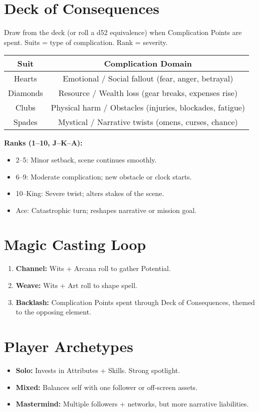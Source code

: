 \documentclass[12pt]{book}
\begin{document}
\section*{Deck of Consequences}
Draw from the deck (or roll a d52 equivalence) when Complication Points are spent.  
Suits = type of complication. Rank = severity.

\begin{tabular}{|c|c|}
\hline
\textbf{Suit} & \textbf{Complication Domain} \\
\hline
Hearts & Emotional / Social fallout (fear, anger, betrayal) \\
\hline
Diamonds & Resource / Wealth loss (gear breaks, expenses rise) \\
\hline
Clubs & Physical harm / Obstacles (injuries, blockades, fatigue) \\
\hline
Spades & Mystical / Narrative twists (omens, curses, chance) \\
\hline
\end{tabular}

\medskip
\noindent
\textbf{Ranks (1–10, J–K–A):}  
\begin{itemize}
  \item 2–5: Minor setback, scene continues smoothly.  
  \item 6–9: Moderate complication; new obstacle or clock starts.  
  \item 10–King: Severe twist; alters stakes of the scene.  
  \item Ace: Catastrophic turn; reshapes narrative or mission goal.  
\end{itemize}

\section*{Magic Casting Loop}
\begin{enumerate}
  \item \textbf{Channel:} Wits + Arcana roll to gather Potential.  
  \item \textbf{Weave:} Wits + Art roll to shape spell.  
  \item \textbf{Backlash:} Complication Points spent through Deck of Consequences, themed to the opposing element.  
\end{enumerate}

\section*{Player Archetypes}
\begin{itemize}
  \item \textbf{Solo:} Invests in Attributes + Skills. Strong spotlight.  
  \item \textbf{Mixed:} Balances self with one follower or off-screen assets.  
  \item \textbf{Mastermind:} Multiple followers + networks, but more narrative liabilities.  
\end{itemize}
\end{document}
